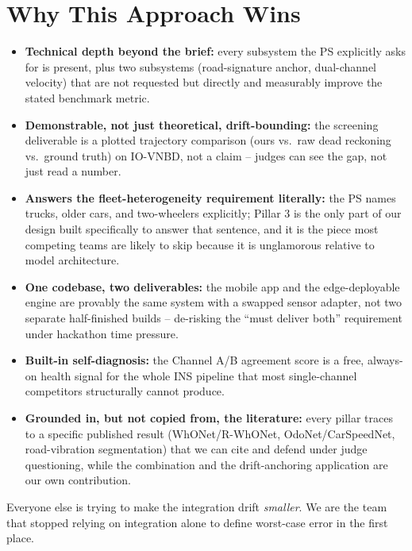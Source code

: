 \documentclass[10.5pt]{article}
\begin{document}
\section{Why This Approach Wins}

\begin{winbox}
\begin{itemize}[leftmargin=1.3em]
\item \textbf{Technical depth beyond the brief:} every subsystem the PS explicitly asks for is present, plus two subsystems (road-signature anchor, dual-channel velocity) that are not requested but directly and measurably improve the stated benchmark metric.
\item \textbf{Demonstrable, not just theoretical, drift-bounding:} the screening deliverable is a plotted trajectory comparison (ours vs.\ raw dead reckoning vs.\ ground truth) on IO-VNBD, not a claim -- judges can see the gap, not just read a number.
\item \textbf{Answers the fleet-heterogeneity requirement literally:} the PS names trucks, older cars, and two-wheelers explicitly; Pillar 3 is the only part of our design built specifically to answer that sentence, and it is the piece most competing teams are likely to skip because it is unglamorous relative to model architecture.
\item \textbf{One codebase, two deliverables:} the mobile app and the edge-deployable engine are provably the same system with a swapped sensor adapter, not two separate half-finished builds -- de-risking the ``must deliver both'' requirement under hackathon time pressure.
\item \textbf{Built-in self-diagnosis:} the Channel A/B agreement score is a free, always-on health signal for the whole INS pipeline that most single-channel competitors structurally cannot produce.
\item \textbf{Grounded in, but not copied from, the literature:} every pillar traces to a specific published result (WhONet/R-WhONet, OdoNet/CarSpeedNet, road-vibration segmentation) that we can cite and defend under judge questioning, while the combination and the drift-anchoring application are our own contribution.
\end{itemize}
\end{winbox}

\vspace{0.3cm}
\begin{keyinsight}
Everyone else is trying to make the integration drift \emph{smaller}. We are the team that stopped relying on integration alone to define worst-case error in the first place.
\end{keyinsight}
\end{document}
